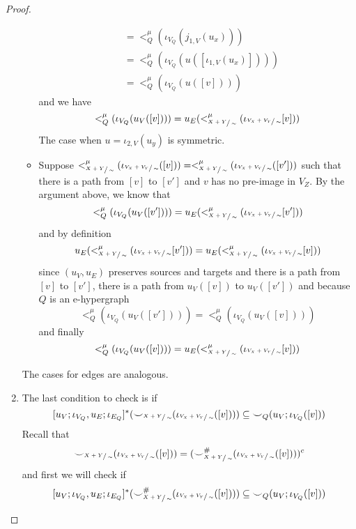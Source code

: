 \begin{proof}
\begin{enumerate}
\begin{itemize}
\begin{align*}
                &= <_{Q}^{\mu}(\iota_{V_{Q}}(j_{1,V}(u_{x})))\\
                &= <_{Q}^{\mu}(\iota_{V_{Q}}(u([\iota_{1,V}(u_{x})])))\\
                &= <_{Q}^{\mu}(\iota_{V_{Q}}(u([v])))
            \end{align*}
            and we have
            \[
                <^{\mu}_{Q}(\iota_{V_{Q}}(u_{V}([v]))) = u_{E}(<^{\mu}_{\sfrac{X+Y}{\sim}}(\iota_{\sfrac{V_{X} + V_{Y}}{\sim}}[v]))
            \]
            The case when $u = \iota_{2,V}(u_{y})$ is symmetric.
        \item Suppose $<_{\sfrac{X+Y}{\sim}}^{\mu}(\iota_{\sfrac{V_{X} + V_{Y}}{\sim}}([v])) = <_{\sfrac{X+Y}{\sim}}^{\mu}(\iota_{\sfrac{V_{X} + V_{Y}}{\sim}}([v']))$ such that there is a path from $[v]$ to $[v']$ and $v$ has no pre-image in $V_{Z}$.
              By the argument above, we know that
              \[
                <^{\mu}_{Q}(\iota_{V_{Q}}(u_{V}([v']))) = u_{E}(<^{\mu}_{\sfrac{X+Y}{\sim}}(\iota_{\sfrac{V_{X} + V_{Y}}{\sim}}[v']))
              \]
              and by definition
              \[
                u_{E}(<^{\mu}_{\sfrac{X+Y}{\sim}}(\iota_{\sfrac{V_{X} + V_{Y}}{\sim}}[v'])) = u_{E}(<^{\mu}_{\sfrac{X+Y}{\sim}}(\iota_{\sfrac{V_{X} + V_{Y}}{\sim}}[v]))
              \]
              since $(u_{V},u_{E})$ preserves sources and targets and there is a path from $[v]$ to $[v']$, there is a path from $u_{V}([v])$ to $u_{V}([v'])$ and because $Q$ is an e-hypergraph
              \[
                <^{\mu}_{Q}(\iota_{V_{Q}}(u_{V}([v']))) = <^{\mu}_{Q}(\iota_{V_{Q}}(u_{V}([v])))
              \]
              and finally
              \[
                <^{\mu}_{Q}(\iota_{V_{Q}}(u_{V}([v]))) = u_{E}(<^{\mu}_{\sfrac{X+Y}{\sim}}(\iota_{\sfrac{V_{X} + V_{Y}}{\sim}}[v]))
              \]
        \end{itemize}
    The cases for edges are analogous.
    \item The last condition to check is if
    \[
    [u_{V};\iota_{V_{Q}}, u_{E};\iota_{E_{Q}}]^{*}({\smile}_{\sfrac{X+Y}{\sim}}(\iota_{\sfrac{V_{X} + V_{Y}}{\sim}}([v]))) \subseteq {\smile}_{Q}(u_{V};\iota_{V_{Q}}([v]))
    \]
    Recall that
    \[
      {\smile}_{\sfrac{X+Y}{\sim}}(\iota_{\sfrac{V_{X} + V_{Y}}{\sim}}([v])) = ({\smile}^{{\#}}_{\sfrac{X+Y}{\sim}}(\iota_{\sfrac{V_{X} + V_{Y}}{\sim}}([v])))^{c}
    \]
    and first we will check if
    \[
      [u_{V};\iota_{V_{Q}}, u_{E};\iota_{E_{Q}}]^{*}({\smile}_{\sfrac{X+Y}{\sim}}^{{\#}}(\iota_{\sfrac{V_{X} + V_{Y}}{\sim}}([v]))) \subseteq {\smile}_{Q}(u_{V};\iota_{V_{Q}}([v]))
\]
\end{enumerate}
\end{proof}
